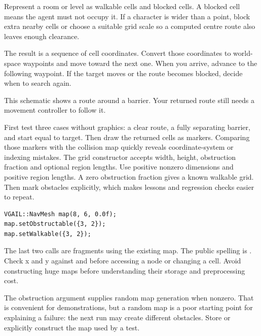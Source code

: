 \documentclass[11pt,a4paper]{article}
\begin{document}
Represent a room or level as walkable cells and blocked cells. A blocked cell means the agent must not occupy it. If a character is wider than a point, block extra nearby cells or choose a suitable grid scale so a computed centre route also leaves enough clearance.

The result is a sequence of cell coordinates. Convert those coordinates to world-space waypoints and move toward the next one. When you arrive, advance to the following waypoint. If the target moves or the route becomes blocked, decide when to search again.

\begin{center}\end{center}
This schematic shows a route around a barrier. Your returned route still needs a movement controller to follow it.

First test three cases without graphics: a clear route, a fully separating barrier, and start equal to target. Then draw the returned cells as markers. Comparing those markers with the collision map quickly reveals coordinate-system or indexing mistakes.
The grid constructor accepts width, height, obstruction fraction and optional region lengths. Use positive nonzero dimensions and positive region lengths. A zero obstruction fraction gives a known walkable grid. Then mark obstacles explicitly, which makes lessons and regression checks easier to repeat.\begin{lstlisting}
VGAIL::NavMesh map(8, 6, 0.0f);
map.setObstructable({3, 2});
map.setWalkable({3, 2});
\end{lstlisting}
The last two calls are fragments using the existing map. The public spelling is . Check x and y against  and  before accessing a node or changing a cell. Avoid constructing huge maps before understanding their storage and preprocessing cost.

The obstruction argument supplies random map generation when nonzero. That is convenient for demonstrations, but a random map is a poor starting point for explaining a failure: the next run may create different obstacles. Store or explicitly construct the map used by a test.
\end{document}
